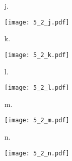 \documentclass[11pt, oneside]{article}
\begin{document}
{\begin{enumerate}
\begin{minipage}{\linewidth}
      \end{minipage}
    \item[j.]
      \begin{minipage}{\linewidth}
        \centering
        \texttt{[image: 5\_2\_j.pdf]}
      \end{minipage}
    \item[k.]
      \begin{minipage}{\linewidth}
        \centering
        \texttt{[image: 5\_2\_k.pdf]}
      \end{minipage}
    \item[l.]
      \begin{minipage}{\linewidth}
        \centering
        \texttt{[image: 5\_2\_l.pdf]}
      \end{minipage}
    \item[m.]
      \begin{minipage}{\linewidth}
        \centering
        \texttt{[image: 5\_2\_m.pdf]}
      \end{minipage}
    \item[n.]
      \begin{minipage}{\linewidth}
        \centering
        \texttt{[image: 5\_2\_n.pdf]}
      \end{minipage}
  \end{enumerate}
}
\end{document}

